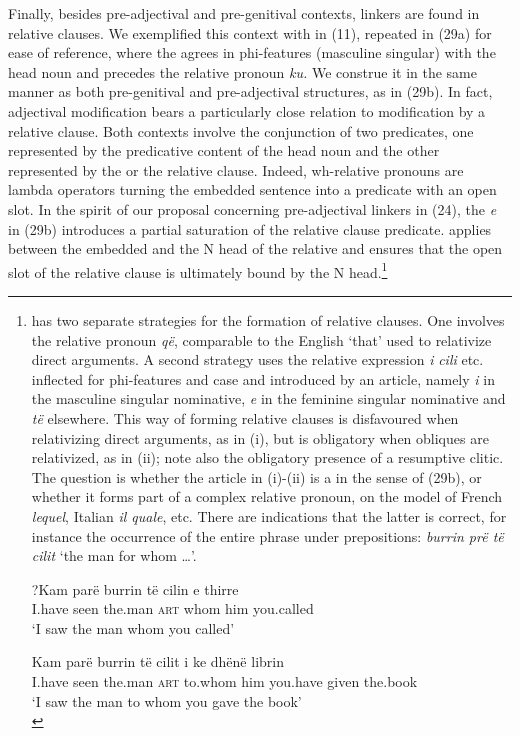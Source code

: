 \documentclass[output=paper]{langsci/langscibook}
\begin{document}
  Finally, besides pre-ad\-jec\-ti\-val and pre-genitival contexts, linkers are found in relative clauses. We exemplified this context with   in (11), repeated in (29a) for ease of reference, where the  agrees in phi-features (masculine singular) with the head noun and precedes the relative pronoun \textit{ku.} We construe it in the same manner as both pre-genitival and pre-ad\-jec\-ti\-val  structures, as in (29b). In fact, adjectival modification bears a particularly close relation to modification by a relative clause. Both contexts involve the conjunction of two predicates, one represented by the predicative content of the head noun and the other represented by the  or the relative clause. Indeed, wh-relative pronouns are lambda operators turning the embedded sentence into a predicate with an open slot. In the spirit of our proposal concerning pre-ad\-jec\-ti\-val linkers in (24), the  \textit{e} in (29b) introduces a partial saturation of the relative clause predicate.  applies between the embedded  and the N head of the relative and ensures that the open slot of the relative clause is ultimately bound by the N head.\footnote{ has two separate strategies for the formation of relative clauses. One involves the relative pronoun \textit{që}, comparable to the English ‘that’ used to relativize direct arguments. A second strategy uses the relative expression \textit{i} \textit{cili} etc. inflected for phi-features and case and introduced by an article, namely \textit{i} in the masculine singular nominative, \textit{e} in the feminine singular nominative and \textit{të} elsewhere. This way of forming relative clauses is disfavoured when relativizing direct arguments, as in (i), but is obligatory when obliques are relativized, as in (ii); note also the obligatory presence of a resumptive clitic. The question is whether the article in (i)-(ii) is a  in the sense of (29b), or whether it forms part of a complex relative pronoun, on the model of French \textit{lequel}, Italian \textit{il quale}, etc. There are indications that the latter is correct, for instance the occurrence of the entire phrase under prepositions: \textit{burrin prë të cilit} ‘the man for whom …’.
  
  \ea   \gll    ?Kam  parë   burrin   të   cilin   e   thirre\\
                I.have   seen   the.man  \textsc{art}   whom  him   you.called\\
  \glt  ‘I saw the man whom you called’
  \z
  
  \ea   \gll    Kam  parë   burrin   të   cilit     i   ke     dhënë   librin\\
                I.have   seen  the.man  \textsc{art}   to.whom    him   you.have   given   the.book\\
        \glt    ‘I saw the man to whom you gave the book’\\
\z}  
\end{document}
